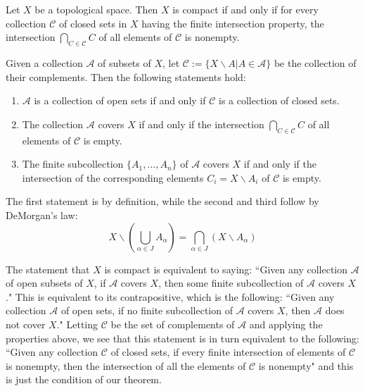 \documentclass[12pt, a4paper, twoside, openright, titlepage]{book}
\begin{document}
\begin{thm}{}{}
    Let $X$ be a topological space. Then $X$ is compact if and only if for every collection $\mathcal{C}$ of closed sets in $X$ having the finite intersection property, the intersection $\bigcap_{C\in\mathcal{C}}C$ of all elements of $\mathcal{C}$ is nonempty.
\end{thm}
\begin{proof*}{}{}
    Given a collection $\mathcal{A}$ of subsets of $X$, let $\mathcal{C} := \{X\backslash A\vert A \in \mathcal{A}\}$ be the collection of their complements. Then the following statements hold: \begin{enumerate}
        \item $\mathcal{A}$ is a collection of open sets if and only if $\mathcal{C}$ is a collection of closed sets.
        \item The collection $\mathcal{A}$ covers $X$ if and only if the intersection $\bigcap_{C\in\mathcal{C}}C$ of all elements of $\mathcal{C}$ is empty.
        \item The finite subcollection $\{A_1,...,A_n\}$ of $\mathcal{A}$ covers $X$ if and only if the intersection of the corresponding elements $C_i = X\backslash A_i$ of $\mathcal{C}$ is empty.
    \end{enumerate}
    The first statement is by definition, while the second and third follow by DeMorgan's law: \begin{equation*}
        X\backslash\left(\bigcup\limits_{\alpha \in J}A_{\alpha}\right) = \bigcap\limits_{\alpha \in J}(X\backslash A_{\alpha})
    \end{equation*}
    

    The statement that $X$ is compact is equivalent to saying: ``Given any collection $\mathcal{A}$ of open subsets of $X$, if $\mathcal{A}$ covers $X$, then some finite subcollection of $\mathcal{A}$ covers $X$." This is equivalent to its contrapositive, which is the following: ``Given any collection $\mathcal{A}$ of open sets, if no finite subcollection of $\mathcal{A}$ covers $X$, then $\mathcal{A}$ does not cover $X$." Letting $\mathcal{C}$ be the set of complements of $\mathcal{A}$ and applying the properties above, we see that this statement is in turn equivalent to the following: ``Given any collection $\mathcal{C}$ of closed sets, if every finite intersection of elements of $\mathcal{C}$ is nonempty, then the intersection of all the elements of $\mathcal{C}$ is nonempty" and this is just the condition of our theorem.
\end{proof*}
\end{document}
